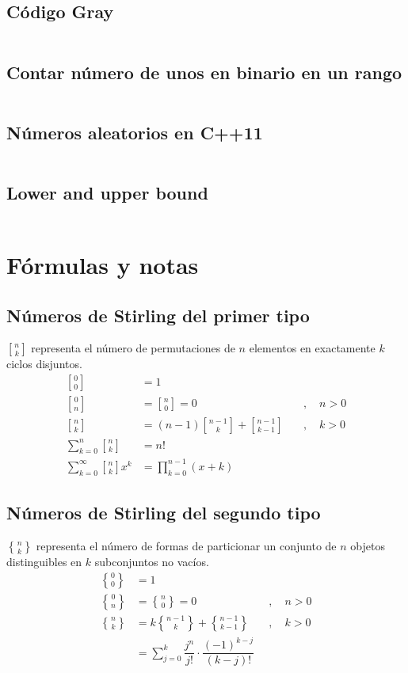 \documentclass[11pt]{article}
\newcommand{\genstirlingI}[3]{%
	\genfrac{[}{]}{0pt}{#1}{#2}{#3}%
}
\newcommand{\genstirlingII}[3]{%
	\genfrac{\{}{\}}{0pt}{#1}{#2}{#3}%
}
\newcommand{\stirlingI}[2]{\genstirlingI{}{#1}{#2}}
\newcommand{\stirlingII}[2]{\genstirlingII{}{#1}{#2}}
\begin{document}
		\subsection{Código Gray}
		\inputminted[tabsize=2,breaklines,firstline=130,lastline=143,fontsize=\small]{c++}{misc.cpp}
		
		\subsection{Contar número de unos en binario en un rango}
		\inputminted[tabsize=2,breaklines,firstline=158,lastline=165,fontsize=\small]{c++}{misc.cpp}
		
		\subsection{Números aleatorios en C++11}
		\inputminted[tabsize=2,breaklines,firstline=167,lastline=180,fontsize=\small]{c++}{misc.cpp}
		
		\subsection{Lower and upper bound}
		\inputminted[tabsize=2,breaklines,firstline=182,lastline=186,fontsize=\small]{c++}{misc.cpp}
		
	\newpage
	\section{Fórmulas y notas}
		\subsection{Números de Stirling del primer tipo}
			$\stirlingI{n}{k}$ representa el número de permutaciones de $n$ elementos en exactamente $k$ ciclos disjuntos.
			\begin{align*}
				\stirlingI{0}{0} &= 1 \\
				\stirlingI{0}{n} &= \stirlingI{n}{0} = 0 \quad &, \quad n>0 \\
				\stirlingI{n}{k} &= (n-1)\stirlingI{n-1}{k} + \stirlingI{n-1}{k-1} \quad &, \quad k>0 \\
				\sum_{k=0}^{n} \stirlingI{n}{k} &= n! \\
				\sum_{k=0}^{\infty} \stirlingI{n}{k} x^k &= \prod_{k=0}^{n-1}(x+k)
			\end{align*}
		
		\subsection{Números de Stirling del segundo tipo}
			$\stirlingII{n}{k}$ representa el número de formas de particionar un conjunto de $n$ objetos distinguibles en $k$ subconjuntos no vacíos.
			\begin{align*}
				\stirlingII{0}{0} &= 1 \\
				\stirlingII{0}{n} &= \stirlingII{n}{0} = 0 \quad &, \quad n>0 \\
				\stirlingII{n}{k} &= k\stirlingII{n-1}{k} + \stirlingII{n-1}{k-1} \quad &, \quad k>0 \\
				&= \sum_{j=0}^{k} \dfrac{j^n}{j!} \cdot \dfrac{(-1)^{k-j}}{(k-j)!}
			\end{align*}
		
\end{document}
